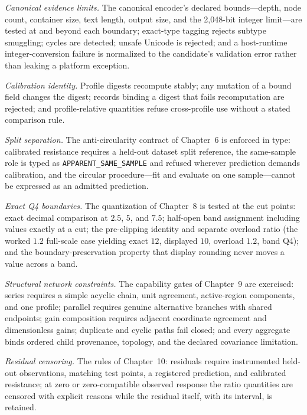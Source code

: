 \emph{Canonical evidence limits.} The canonical encoder's declared bounds---depth, node count, container size, text length, output size, and the 2{,}048-bit integer limit---are tested at and beyond each boundary; exact-type tagging rejects subtype smuggling; cycles are detected; unsafe Unicode is rejected; and a host-runtime integer-conversion failure is normalized to the candidate's validation error rather than leaking a platform exception.

\emph{Calibration identity.} Profile digests recompute stably; any mutation of a bound field changes the digest; records binding a digest that fails recomputation are rejected; and profile-relative quantities refuse cross-profile use without a stated comparison rule.

\emph{Split separation.} The anti-circularity contract of Chapter~6 is enforced in type: calibrated resistance requires a held-out dataset split reference, the same-sample role is typed as \texttt{APPARENT\_SAME\_SAMPLE} and refused wherever prediction demands calibration, and the circular procedure---fit and evaluate on one sample---cannot be expressed as an admitted prediction.

\emph{Exact Q4 boundaries.} The quantization of Chapter~8 is tested at the cut points: exact decimal comparison at $2.5$, $5$, and $7.5$; half-open band assignment including values exactly at a cut; the pre-clipping identity and separate overload ratio (the worked $1.2$ full-scale case yielding exact $12$, displayed $10$, overload $1.2$, band Q4); and the boundary-preservation property that display rounding never moves a value across a band.

\emph{Structural network constraints.} The capability gates of Chapter~9 are exercised: series requires a simple acyclic chain, unit agreement, active-region components, and one profile; parallel requires genuine alternative branches with shared endpoints; gain composition requires adjacent coordinate agreement and dimensionless gains; duplicate and cyclic paths fail closed; and every aggregate binds ordered child provenance, topology, and the declared covariance limitation.

\emph{Residual censoring.} The rules of Chapter~10: residuals require instrumented held-out observations, matching test points, a registered prediction, and calibrated resistance; at zero or zero-compatible observed response the ratio quantities are censored with explicit reasons while the residual itself, with its interval, is retained.

